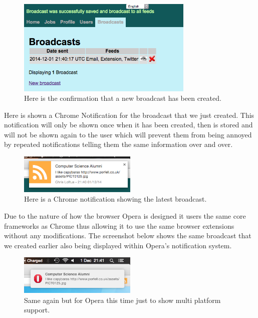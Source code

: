 \documentclass{article}
\begin{document}
\begin{figure}[H]
\centering
\includegraphics[width=0.75\textwidth]{confbc}
\caption{Here is the confirmation that a new broadcast has been created.}
\end{figure}

Here is shown a Chrome Notification for the broadcast that we just created. This notification will only be shown once when it has been created, then is stored and will not be shown again to the user which will prevent them from being annoyed by repeated notifications telling them the same information over and over.

\begin{figure}[H]
\centering
\includegraphics[width=0.5\textwidth]{chromenotification}
\caption{Here is a Chrome notification showing the latest broadcast.}
\end{figure}

Due to the nature of how the browser Opera is designed it users the same core frameworks as Chrome thus allowing it to use the same browser extensions without any modifications. The screenshot below shows the same broadcast that we created earlier also being displayed within Opera's notification system.

\begin{figure}[H]
\centering
\includegraphics[width=0.5\textwidth]{operanotification}
\caption{Same again but for Opera this time just to show multi platform support.}
\end{figure}
\end{document}
